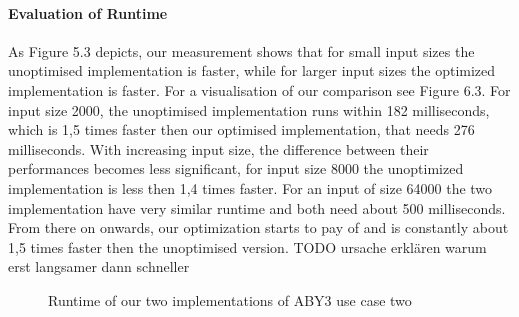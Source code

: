 \paragraph{Evaluation of Runtime}
As Figure 5.3 depicts, our measurement shows that for small input sizes the unoptimised implementation is faster, while for larger input sizes the optimized implementation is faster. For a visualisation of our comparison see Figure 6.3. For input size 2000, the unoptimised implementation runs within 182 milliseconds, which is 1,5 times faster then our optimised implementation, that needs 276 milliseconds. With increasing input size, the difference between their performances becomes less significant, for input size 8000 the unoptimized implementation is less then 1,4 times faster. For an input of size 64000 the two implementation have very similar runtime and both need about 500 milliseconds. From there on onwards, our optimization starts to pay of and is constantly about 1,5 times faster then the unoptimised version. 
TODO ursache erklären warum erst langsamer dann schneller

\begin{figure}[H]
\caption{Runtime of our two implementations of ABY3  use case two}
\end{figure}
